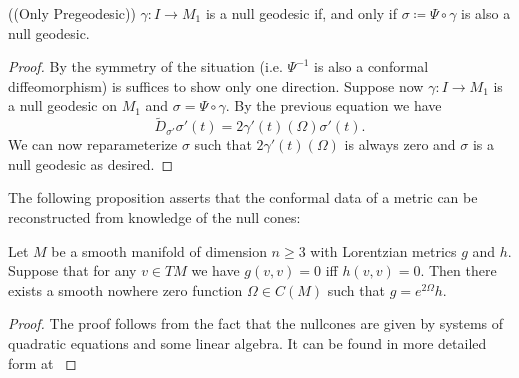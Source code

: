 \begin{proposition}((Only Pregeodesic)) $\gamma:I\to M_1$ is a null geodesic if, and only if $\sigma\coloneqq\Psi\circ\gamma$ is also a null geodesic. 
\end{proposition}
\begin{proof}
By the symmetry of the situation (i.e. $\Psi^{-1}$ is also a conformal diffeomorphism) is suffices to show only one direction.
Suppose now $\gamma:I\to M_1$ is a null geodesic on $M_1$ and $\sigma=\Psi\circ\gamma$. 
By the previous equation we have 
\[
\widetilde{D}_{\sigma'}\sigma'(t) = 2\gamma'(t)(\Omega)\sigma'(t).
\]
We can now reparameterize $\sigma$  such that $2\gamma'(t)(\Omega)$ is always zero and $\sigma$ is a null geodesic as desired.
\end{proof}

The following proposition asserts that the conformal data of a metric can be reconstructed from knowledge of the null cones:
\begin{proposition}\label{prop:metricfromnullcone}
Let $M$ be a smooth manifold of dimension $n\geq 3$ with Lorentzian metrics $g$ and $h$. Suppose that for any $v\in TM$ we have $g(v,v)=0$ iff $h(v,v)=0$. Then there exists a smooth nowhere zero function $\Omega\in C(M)$ such that $g = e^{2\Omega}h$.
\end{proposition}
\begin{proof}
The proof follows from the fact that the nullcones are given by systems of quadratic equations and some linear algebra. It can be found in more detailed form at \cite[Theorem 2.3]{beem}
\end{proof}

